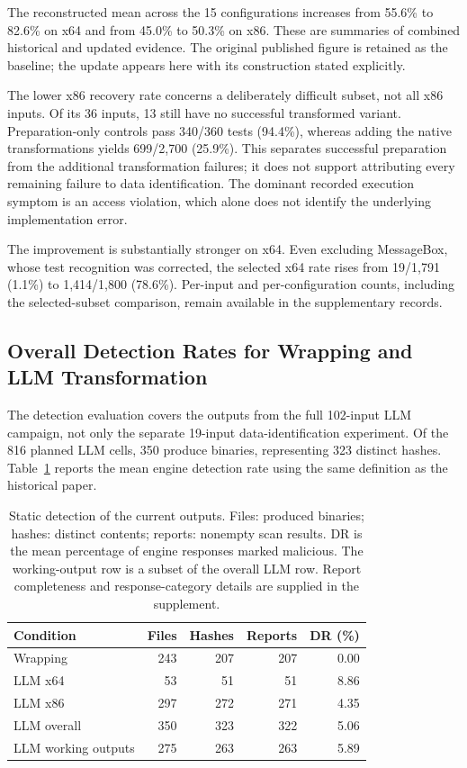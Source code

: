 The reconstructed mean across the 15 configurations increases from
55.6\% to 82.6\% on x64 and from 45.0\% to 50.3\% on x86.
These are summaries of combined historical and updated evidence. The
original published figure is retained as the baseline; the update appears
here with its construction stated explicitly.



The lower x86 recovery rate concerns a deliberately difficult subset,
not all x86 inputs. Of its 36 inputs, 13 still have no successful
transformed variant. Preparation-only controls pass 340/360 tests (94.4\%),
whereas adding the native transformations yields 699/2,700 (25.9\%).
This separates successful preparation from the additional transformation
failures; it does not support attributing every remaining failure to data
identification. The dominant recorded execution symptom is an access
violation, which alone does not identify the underlying implementation error.

The improvement is substantially stronger on x64. Even excluding
MessageBox, whose test recognition was corrected, the selected x64 rate
rises from 19/1,791 (1.1\%) to 1,414/1,800 (78.6\%). Per-input and
per-configuration counts, including the selected-subset comparison, remain
available in the supplementary records.

\subsection{Overall Detection Rates for Wrapping and LLM Transformation}
The detection evaluation covers the outputs from the full 102-input LLM
campaign, not only the separate 19-input data-identification experiment.
Of the 816 planned LLM cells, 350 produce binaries, representing 323
distinct hashes. Table~\ref{tab:current_scans} reports the mean engine
detection rate using the same definition as the historical paper.

\begin{table}[t]
\caption{Static detection of the current outputs. Files: produced binaries;
hashes: distinct contents; reports: nonempty scan results. DR is the mean
percentage of engine responses marked malicious.
The working-output row is a subset of the overall LLM row. Report
completeness and response-category details are supplied in the supplement.}
\label{tab:current_scans}
\centering\small\setlength{\tabcolsep}{6pt}
\begin{tabular}{@{}lrrrr@{}}
\toprule
Condition & Files & Hashes & Reports & DR (\%) \\
\midrule
Wrapping & 243 & 207 & 207 & 0.00 \\
LLM x64 & 53 & 51 & 51 & 8.86 \\
LLM x86 & 297 & 272 & 271 & 4.35 \\
\midrule
LLM overall & 350 & 323 & 322 & 5.06 \\
LLM working outputs & 275 & 263 & 263 & 5.89 \\
\bottomrule
\end{tabular}
\end{table}

